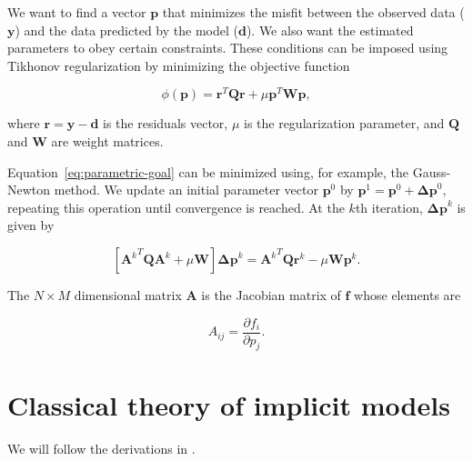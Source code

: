 \documentclass[onecolumn]{article}
\begin{document}
We want to find a vector $\mathbf{p}$ that minimizes the misfit between the
observed data ($\mathbf{y}$) and the data predicted by the model
($\mathbf{d}$).
We also want the estimated parameters to obey certain constraints.
These conditions can be imposed using Tikhonov regularization
\citep{tikhonov1977} by minimizing the objective function

\begin{equation}
    \phi(\mathbf{p}) = \mathbf{r}^T\mathbf{Q}\mathbf{r}
                       + \mu \mathbf{p}^T\mathbf{W}\mathbf{p},
    \label{eq:parametric-goal}
\end{equation}

\noindent
where $\mathbf{r} = \mathbf{y} - \mathbf{d}$ is the residuals vector,
$\mu$ is the regularization parameter, and $\mathbf{Q}$ and $\mathbf{W}$ are
weight matrices.

Equation~\ref{eq:parametric-goal} can be minimized using, for example, the
Gauss-Newton method.
We update an initial parameter vector $\mathbf{p}^0$ by $\mathbf{p}^1 =
\mathbf{p}^0 + \mathbf{\Delta p}^0$, repeating this operation until convergence
is reached.
At the $k$th iteration, $\mathbf{\Delta p}^k$ is given by

\begin{equation}
    \left[ {\mathbf{A}^k}^T \mathbf{Q} \mathbf{A}^k + \mu\mathbf{W} \right]
    \mathbf{\Delta p}^k =
        {\mathbf{A}^k}^T\mathbf{Q}\mathbf{r}^k
        - \mu\mathbf{W}\mathbf{p}^k.
    \label{eq:gauss-newton}
\end{equation}

\noindent
The $N \times M$ dimensional matrix $\mathbf{A}$ is the Jacobian matrix of
$\mathbf{f}$ whose elements are

\begin{equation}
    A_{ij} = \dfrac{\partial f_i}{\partial p_j}.
    \label{eq:jacobian-params}
\end{equation}



\section{Classical theory of implicit models}


We will follow the derivations in \citet{vanicek1986}.
\end{document}
